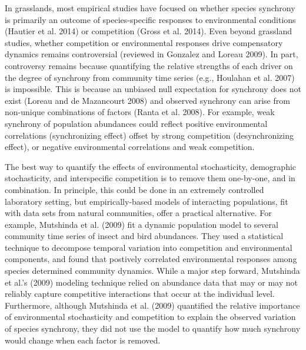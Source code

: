 \documentclass[12pt,]{article}
\begin{document}
In grasslands, most empirical studies have focused on whether species
synchrony is primarily an outcome of species-specific responses to
environmental conditions (Hautier et al. 2014) or competition (Gross et
al. 2014). Even beyond grassland studies, whether competition or
environmental responses drive compensatory dynamics remains
controversial (reviewed in Gonzalez and Loreau 2009). In part,
controversy remains because quantifying the relative strengths of each
driver on the degree of synchrony from community time series (e.g.,
Houlahan et al. 2007) is impossible. This is because an unbiased null
expectation for synchrony does not exist (Loreau and {{de Mazancourt}}
2008) and observed synchrony can arise from non-unique combinations of
factors (Ranta et al. 2008). For example, weak synchrony of population
abundances could reflect positive environmental correlations
(synchronizing effect) offset by strong competition (desynchronizing
effect), or negative environmental correlations and weak competition.

The best way to quantify the effects of environmental stochasticity,
demographic stochasticity, and interspecific competition is to remove
them one-by-one, and in combination. In principle, this could be done in
an extremely controlled laboratory setting, but empirically-based models
of interacting populations, fit with data sets from natural communities,
offer a practical alternative. For example, Mutshinda et al. (2009) fit
a dynamic population model to several community time series of insect
and bird abundances. They used a statistical technique to decompose
temporal variation into competition and environmental components, and
found that postively correlated environmental responses among species
determined community dynamics. While a major step forward, Mutshinda et
al.'s (2009) modeling technique relied on abundance data that may or may
not reliably capture competitive interactions that occur at the
individual level. Furthermore, although Mutshinda et al. (2009)
quantified the relative importance of environmental stochasticity and
competition to explain the observed variation of species synchrony, they
did not use the model to quantify how much synchrony would change when
each factor is removed.
\end{document}
